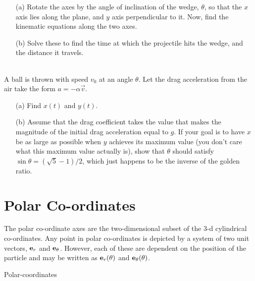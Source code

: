 \begin{exc}
\begin{exercise}[subtitle={Projectile Motion in tilted axes.}, points = 2]
            \begin{enumerate}
                \item[(a)] Rotate the axes by the angle of inclination of the wedge, $\theta$, so that the $x$ axis 
                lies along the plane, and $y$ axis perpendicular to it. Now, find the kinematic equations along the two axes.

                \item[(b)] Solve these to find the time at which the projectile hits the wedge, and the distance it travels.
            \end{enumerate}
            \label{exc: projectile-tilted}
        \end{exercise}
        \begin{exercise}[subtitle={Projectile with drag, Morin}, points = 4]
        \smallskip
        ~\\
        A ball is thrown with speed $v_0$ at an angle $\theta$. Let the drag acceleration from the
        air take the form $a = -\alpha \vec{v}$.
        \begin{enumerate}
            \item[(a)] Find $x(t)$ and $y(t)$.
            \item[(b)] Assume that the drag coefficient takes the value that makes the magnitude of the
             initial drag acceleration equal to $g$. If your goal is to have $x$ be as large as possible when
             $y$ achieves its maximum value (you don't care what this maximum
             value actually is), show that $\theta$ should satisfy $\sin \theta = (\sqrt{5} - 1)/2$, which just happens to be 
             the inverse of the golden
             ratio. 
        \end{enumerate}
        \end{exercise}
    \end{exc}


    \section{Polar Co-ordinates}

    The polar co-ordinate axes are the two-dimensional subset of the 3-d cylindrical co-ordinates. Any point 
    in polar co-ordinates is depicted by a system of two unit vectors, $\mathbf{\boldsymbol{e}}_{r}$ and 
    $\mathbf{\boldsymbol{e}}_{\theta}$. However, each of these are dependent on the 
    position of the particle and may be written as $\mathbf{\boldsymbol{e}}_{r}(\theta)$ 
    and $\mathbf{\boldsymbol{e}}_{\theta}(\theta)$.

    \begin{marginfigure}
        \vspace*{4.5em}
        \hspace*{-5.7em}
        \vspace{-3em}
        \caption{Polar-coordinates}
        \label{fig: polar}
    \end{marginfigure}


